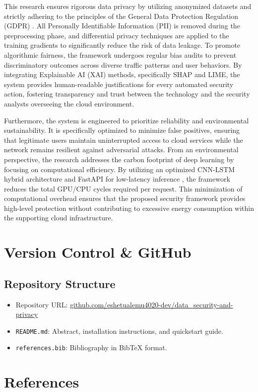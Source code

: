 \documentclass[12pt, a4paper]{article}
\begin{document}
This research ensures rigorous data privacy by utilizing anonymized datasets and strictly adhering to the principles of the General Data Protection Regulation (GDPR) \cite{gdpr2018}. All Personally Identifiable Information (PII) is removed during the preprocessing phase, and differential privacy techniques are applied to the training gradients to significantly reduce the risk of data leakage. To promote algorithmic fairness, the framework undergoes regular bias audits to prevent discriminatory outcomes across diverse traffic patterns and user behaviors. By integrating Explainable AI (XAI) methods, specifically SHAP and LIME, the system provides human-readable justifications for every automated security action, fostering transparency and trust between the technology and the security analysts overseeing the cloud environment.

Furthermore, the system is engineered to prioritize reliability and environmental sustainability. It is specifically optimized to minimize false positives, ensuring that legitimate users maintain uninterrupted access to cloud services while the network remains resilient against adversarial attacks. From an environmental perspective, the research addresses the carbon footprint of deep learning by focusing on computational efficiency. By utilizing an optimized CNN-LSTM hybrid architecture and FastAPI for low-latency inference \cite{alam2024fastapi}, the framework reduces the total GPU/CPU cycles required per request. This minimization of computational overhead ensures that the proposed security framework provides high-level protection without contributing to excessive energy consumption within the supporting cloud infrastructure.
\section{Version Control \& GitHub}

\subsection{Repository Structure}
\begin{itemize}
    \item Repository URL: \href{https://github.com/eshetualemu4020-dev/data_security-and-privacy-}{github.com/eshetualemu4020-dev/data_security-and-privacy}
    \item \texttt{README.md}: Abstract, installation instructions, and quickstart guide.
    \item \texttt{references.bib}: Bibliography in BibTeX format.
\end{itemize}

\section{References} 

 
\end{document}
